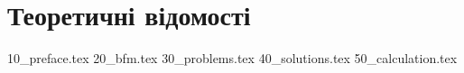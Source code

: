 \chapter{Теоретичні відомості}
{10_preface.tex}
{20_bfm.tex}
{30_problems.tex}
{40_solutions.tex}
{50_calculation.tex}
